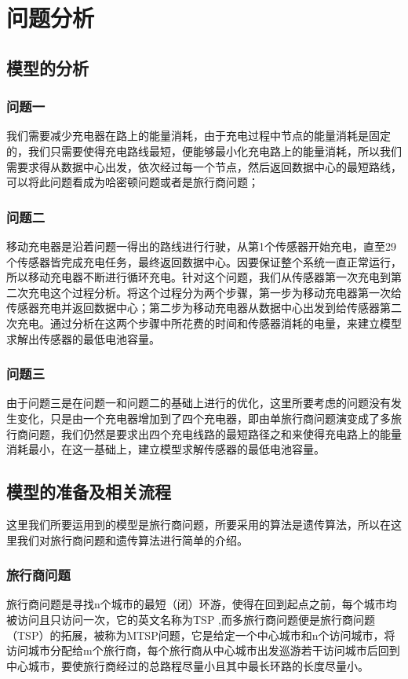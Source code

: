\documentclass{article}
\begin{document}
\section{问题分析}
\subsection{模型的分析}
\subsubsection{问题一}
我们需要减少充电器在路上的能量消耗，由于充电过程中节点的能量消耗是固定的，我们只需要使得充电路线最短，便能够最小化充电路上的能量消耗，所以我们需要求得从数据中心出发，依次经过每一个节点，然后返回数据中心的最短路线，可以将此问题看成为哈密顿问题或者是旅行商问题；
\subsubsection{问题二}
移动充电器是沿着问题一得出的路线进行行驶，从第1个传感器开始充电，直至29个传感器皆完成充电任务，最终返回数据中心。因要保证整个系统一直正常运行，所以移动充电器不断进行循环充电。针对这个问题，我们从传感器第一次充电到第二次充电这个过程分析。将这个过程分为两个步骤，第一步为移动充电器第一次给传感器充电并返回数据中心；第二步为移动充电器从数据中心出发到给传感器第二次充电。通过分析在这两个步骤中所花费的时间和传感器消耗的电量，来建立模型求解出传感器的最低电池容量。
\subsubsection{问题三}
由于问题三是在问题一和问题二的基础上进行的优化，这里所要考虑的问题没有发生变化，只是由一个充电器增加到了四个充电器，即由单旅行商问题演变成了多旅行商问题，我们仍然是要求出四个充电线路的最短路径之和来使得充电路上的能量消耗最小，在这一基础上，建立模型求解传感器的最低电池容量。
\subsection{模型的准备及相关流程}
这里我们所要运用到的模型是旅行商问题，所要采用的算法是遗传算法，所以在这里我们对旅行商问题和遗传算法进行简单的介绍。
\subsubsection{旅行商问题}
旅行商问题是寻找n个城市的最短（闭）环游，使得在回到起点之前，每个城市均被访问且只访问一次，它的英文名称为TSP\cite{ref1} ,而多旅行商问题便是旅行商问题（TSP）的拓展，被称为MTSP问题，它是给定一个中心城市和n个访问城市，将访问城市分配给m个旅行商，每个旅行商从中心城市出发巡游若干访问城市后回到中心城市，要使旅行商经过的总路程尽量小且其中最长环路的长度尽量小\cite{ref2}。
\end{document}
